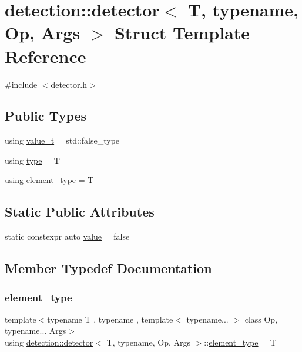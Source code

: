 \hypertarget{structdetection_1_1detector}{}\section{detection\+:\+:detector$<$ T, typename, Op, Args $>$ Struct Template Reference}
\label{structdetection_1_1detector}


{\ttfamily \#include $<$detector.\+h$>$}

\subsection*{Public Types}
\begin{DoxyCompactItemize}
\item 
using \hyperlink{structdetection_1_1detector_af1f7df0c48576571b02511a65673b5a8}{value\+\_\+t} = std\+::false\+\_\+type
\item 
using \hyperlink{structdetection_1_1detector_a5045a7b616b1dddb663ab56abd3504f0}{type} = T
\item 
using \hyperlink{structdetection_1_1detector_a9eca84b9e67c56131be58d610ef43a2a}{element\+\_\+type} = T
\end{DoxyCompactItemize}
\subsection*{Static Public Attributes}
\begin{DoxyCompactItemize}
\item 
static constexpr auto \hyperlink{structdetection_1_1detector_a6d7d0e1bdf5903db9edbe448edccf83b}{value} = false
\end{DoxyCompactItemize}


\subsection{Member Typedef Documentation}
\mbox{\label{structdetection_1_1detector_a9eca84b9e67c56131be58d610ef43a2a}} 
\subsubsection{\texorpdfstring{element\+\_\+type}{element\_type}}
{\footnotesize\ttfamily template$<$typename T , typename , template$<$ typename... $>$ class Op, typename... Args$>$ \\
using \hyperlink{structdetection_1_1detector}{detection\+::detector}$<$ T, typename, Op, Args $>$\+::\hyperlink{structdetection_1_1detector_a9eca84b9e67c56131be58d610ef43a2a}{element\+\_\+type} =  T}

